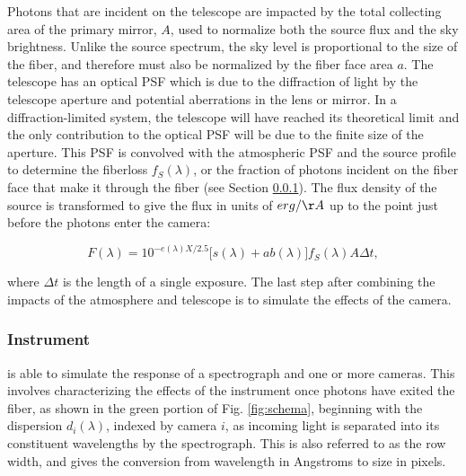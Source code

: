 Photons that are incident on the telescope are impacted by the total collecting area of the primary mirror, $A$, used to normalize both the source flux and the sky brightness. Unlike the source spectrum, the sky level is proportional to the size of the fiber, and therefore must also be normalized by the fiber face area $a$. The telescope has an optical PSF which is due to the diffraction of light by the telescope aperture and potential aberrations in the lens or mirror. In a diffraction-limited system, the telescope will have reached its theoretical limit and the only contribution to the optical PSF will be due to the finite size of the aperture. This PSF is convolved with the atmospheric PSF and the source profile to determine the fiberloss $f_{S}(\lambda)$, or the fraction of photons incident on the fiber face that make it through the fiber (see Section \ref{sec:instrument}). The flux density of the source is transformed to give the flux in units of $erg / \AA$ up to the point just before the photons enter the camera: 

\begin{equation}
    F(\lambda) = 10^{-e(\lambda)X/2.5}\Big[s(\lambda) + ab(\lambda)\Big]f_{S}(\lambda)A\Delta t,
\label{eq:flux}
\end{equation}

where $\Delta t$ is the length of a single exposure. The last step after combining the impacts of the atmosphere and telescope is to simulate the effects of the camera.\\ 

\subsubsection{Instrument}
\label{sec:instrument}
 is able to simulate the response of a spectrograph and one or more cameras. This involves characterizing the effects of the instrument once photons have exited the fiber, as shown in the green portion of Fig. \ref{fig:schema}, beginning with the dispersion $d_{i}(\lambda)$, indexed by camera $i$, as incoming light is separated into its constituent wavelengths by the spectrograph. This is also referred to as the row width, and gives the conversion from wavelength in Angstroms to size in pixels.\\

